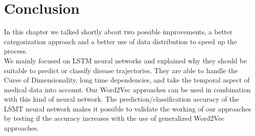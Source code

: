 \section{Conclusion}

In this chapter we talked shortly about two possible improvements, a better categorization approach and a better use of data distribution to speed up the process. \\
We mainly focused on LSTM neural networks and explained why they should be suitable to predict or classify disease trajectories. They are able to handle the Curse of Dimensionality, long time dependencies, and take the temporal aspect of medical data into account. Our Word2Vec approaches can be used in combination with this kind of neural network. The prediction/classification accuracy of the LSMT neural network makes it possible to validate the working of our approaches by testing if the accuracy increases with the use of generalized Word2Vec approaches. \\


